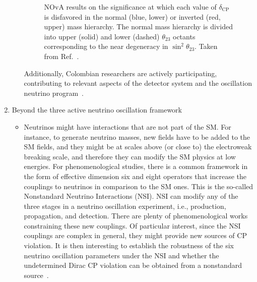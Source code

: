 \documentclass[a4paper,11pt]{article}
\begin{document}
\begin{enumerate}
\begin{itemize}
\begin{figure}
	    \caption{NOvA results on the significance at which each value of $\delta_\text{CP}$ is disfavored in the normal (blue, lower) or inverted (red, upper) mass hierarchy. The normal mass hierarchy is divided into upper (solid) and lower (dashed) $\theta_{23}$ octants corresponding to the near degeneracy in $\sin^2\theta_{23}$.  Taken from Ref.~\cite{NOvA:2018gge}.}
    	\label{fig:nova}
        \end{figure} 
        Additionally, Colombian researchers are actively participating, contributing to relevant aspects of the detector system and the oscillation neutrino program~\cite{Abi:2020wmh, Abi:2020evt, Abi:2020qib}.
    \end{itemize}
    \newpage
    \item Beyond the three active neutrino oscillation framework
    \begin{itemize}
        \item Neutrinos might have interactions that are not part of the SM. For instance, to generate neutrino masses, new fields have to be added to the SM fields, and they might be at scales above (or close to) the electroweak breaking scale, and therefore they can modify the SM physics at low energies. For phenomenological studies, there is a common framework in the form of effective dimension six and eight operators that increase the couplings to neutrinos in comparison to the SM ones. This is the so-called Nonstandard Neutrino Interactions (NSI). NSI can modify any of the three stages in a neutrino oscillation experiment, i.e., production, propagation, and detection. There are plenty of phenomenological works constraining these new couplings. Of particular interest, since the NSI couplings are complex in general, they might provide new sources of CP violation. It is then interesting to establish the robustness of the six neutrino oscillation parameters under the NSI and whether the undetermined Dirac CP violation can be obtained from a nonstandard source~\cite{Forero:2016cmb}.
    \begin{figure}

\end{figure}
\end{itemize}
\end{enumerate}
\end{document}
